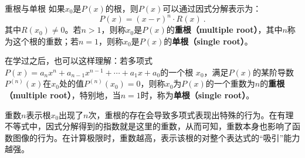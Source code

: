 \begin{definition}{重根与单根}
如果$x_0$是$P(x)$的根，则$P(x)$可以通过因式分解表示为：
\begin{equation}
P(x) = (x - r)^n \cdot R(x)~.
\end{equation}
其中$R(x_0) \neq 0$。若$n>1$，则称$x_0$是$P(x)$的\textbf{重根（multiple root）}，其中$n$称为这个根的重数；若$n=1$，则称$x_0$是$P(x)$的\textbf{单根（single root）}。
\end{definition}

在学过之后，也可以这样理解：若多项式 $P(x) = a_n x^n + a_{n-1} x^{n-1} + \cdots + a_1 x + a_0$的一个根 $x_0$，满足$P(x)$的某阶导数$P^{(n)}(x)$在$x_0$处的值$P^{(n)}(x_0)=0$，则称$x_0$为$P(x)$的一个重数为$n$的\textbf{重根（multiple root）}，特别地，当$n=1$时，称为\textbf{单根（single root）}。

重数$n$表示根$x_0$出现了$n$次，重根的存在会导致多项式表现出特殊的行为。在有理不等式中，因式分解得到的指数就是这里的重数，从而可知，重数本身也影响了函数图像的行为。在计算极限时，重数越高，表示该根的对整个表达式的“吸引”能力越强。
